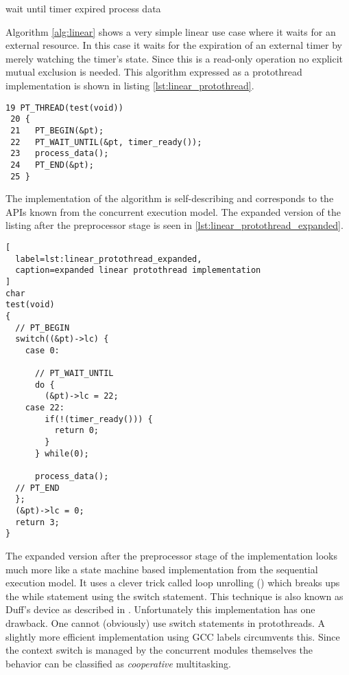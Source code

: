 \begin{algorithm}[H]
\caption{Simple linear algorithm}
\label{alg:linear}
\begin{algorithmic}
    \STATE wait until timer expired
    \STATE process data
\ENDWHILE
\end{algorithmic}
\end{algorithm}

Algorithm \ref{alg:linear} shows a very simple linear use case where it waits for an external resource. In this case it waits for the expiration of an external timer by merely watching the timer's state. Since this is a read-only operation no explicit mutual exclusion is needed. This algorithm expressed as a protothread implementation is shown in listing \ref{lst:linear_protothread}.

\begin{lstlisting}[label=lst:linear_protothread,caption=linear protothread implementation]
 19 PT_THREAD(test(void))
 20 {
 21   PT_BEGIN(&pt);
 22   PT_WAIT_UNTIL(&pt, timer_ready());
 23   process_data();
 24   PT_END(&pt);
 25 }
\end{lstlisting}

The implementation of the algorithm is self-describing and corresponds to the APIs known from the concurrent execution model. The expanded version of the listing after the preprocessor stage is seen in \ref{lst:linear_protothread_expanded}.

\begin{lstlisting}[
  label=lst:linear_protothread_expanded,
  caption=expanded linear protothread implementation
]
char
test(void)
{
  // PT_BEGIN
  switch((&pt)->lc) {
    case 0:

      // PT_WAIT_UNTIL
      do {
        (&pt)->lc = 22;
    case 22:
        if(!(timer_ready())) {
          return 0;
        }
      } while(0);

      process_data();
  // PT_END
  };
  (&pt)->lc = 0;
  return 3;
}
\end{lstlisting}

The expanded version after the preprocessor stage of the implementation looks much more like a state machine based implementation from the sequential execution model. It uses a clever trick called loop unrolling (\cite{abrash}) which breaks ups the while statement using the switch statement. This technique is also known as Duff's device as described in \cite{duff}. Unfortunately this implementation has one drawback. One cannot (obviously) use switch statements in protothreads. A slightly more efficient implementation using GCC labels circumvents this. Since the context switch is managed by the concurrent modules themselves the behavior can be classified as \emph{cooperative} multitasking.

